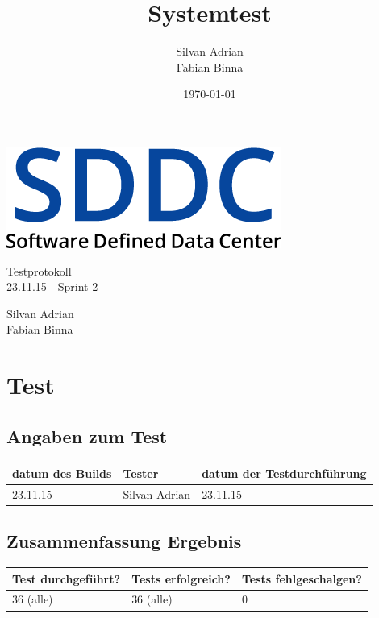 \documentclass[11pt]{scrartcl}
\title{Systemtest}
\author{Silvan Adrian \\ Fabian Binna}
\date{\today{}}
\begin{document}
\def\arraystretch{1.5}
\begin{titlepage}
\begin{center}
\vspace{10em}
\includegraphics[scale=2]{SDDC}
\vspace{10em}
\end{center}
\begin{center}
\huge {Testprotokoll}\\
\huge {23.11.15 - Sprint 2}\\
\end{center}
\begin{center}
\vspace{10em}
\LARGE {Silvan Adrian} \\
\LARGE {Fabian Binna}
\end{center}

\end{titlepage}


\newpage
\tableofcontents
\newpage

\section{Test}
\subsection{Angaben zum Test}

\begin{tabularx}{\linewidth}{l l l}
\textbf{datum des Builds} & \textbf{Tester} & \textbf{datum der Testdurchführung}\\
\hline
23.11.15 & Silvan Adrian & 23.11.15

\end{tabularx}

\subsection{Zusammenfassung Ergebnis}
\begin{tabularx}{\linewidth}{l l l}
\textbf{Test durchgeführt?} & \textbf{Tests erfolgreich?} & \textbf{Tests fehlgeschalgen?}\\
\hline
36 (alle) & 36 (alle) & 0 \\
\hline
\end{tabularx}
\end{document}
